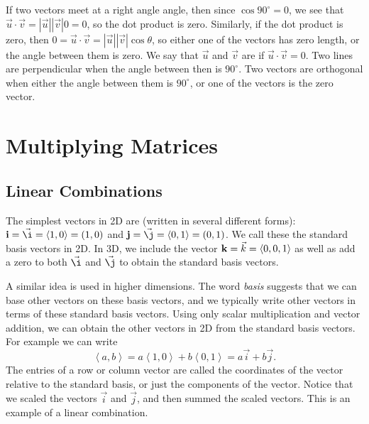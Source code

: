 If two vectors meet at a right angle angle, then since $\cos 90^\circ = 0$, we see that $\vec u \cdot \vec v = |\vec u||\vec v|0=0$, so the dot product is zero. 
Similarly, if the dot product is zero, then $0=\vec u \cdot \vec v = |\vec u||\vec v|\cos \theta$, so either one of the vectors has zero length, or the angle between them is zero. 
We say that $\vec u$ and $\vec v$ are  if $\vec u \cdot \vec v=0$. 
Two lines are perpendicular when the angle between then is $90^\circ$. Two vectors are orthogonal when either the angle between them is $90^\circ$, or one of the vectors is the zero vector.

\section{Multiplying Matrices}


\subsection{Linear Combinations}

The simplest vectors in 2D are (written in several different forms): 
$\ii = \vec \i = \left<1,0\right>=(1,0)$ and  
$\jj = \vec \j = \left<0,1\right>=(0,1)$. 
We call these the standard basis vectors in 2D. 
In 3D, we include the vector $\mathbf{k} = \vec k=\left<0,0,1\right>$ as well as add a zero to both $\vec \i$ and $\vec \j$ to obtain the standard basis vectors. 

A similar idea is used in higher dimensions. 
The word \emph{basis} suggests that we can base other vectors on these basis vectors, and we typically write other vectors in terms of these standard basis vectors. 
Using only scalar multiplication and vector addition, we can obtain the other vectors in 2D from the standard basis vectors. 
For example we can write $$\left<a,b\right> =a\left<1,0\right>+b\left<0,1\right> = a\vec i+b\vec j.$$ 
The entries of a row or column vector are called the coordinates of the vector relative to the standard basis, or just the components of the vector. 
Notice that we scaled the vectors $\vec i$ and $\vec j$, and then summed the scaled vectors. 
This is an example of a linear combination.

